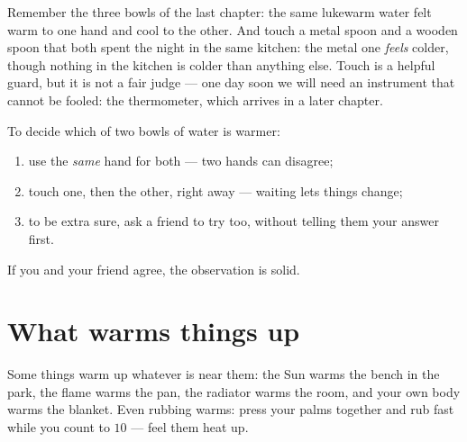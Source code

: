 \begin{remark}\label{rem:g1:hot-and-cold:fooled}
Remember the three bowls of the last chapter: the same lukewarm water
felt warm to one hand and cool to the other. And touch a metal spoon
and a wooden spoon that both spent the night in the same kitchen: the
metal one \emph{feels} colder, though nothing in the kitchen is
colder than anything else. Touch is a helpful guard, but it is not a
fair judge --- one day soon we will need an instrument that cannot be
fooled: the thermometer, which arrives in a later chapter.
\end{remark}

\begin{method}\label{met:g1:hot-and-cold:compare}
To decide which of two bowls of water is warmer:
\begin{enumerate}
  \item use the \emph{same} hand for both --- two hands can disagree;
  \item touch one, then the other, right away --- waiting lets things
        change;
  \item to be extra sure, ask a friend to try too, without telling
        them your answer first.
\end{enumerate}
If you and your friend agree, the observation is solid.
\end{method}

\section{What warms things up}

\begin{example}[Warmers]\label{ex:g1:hot-and-cold:warmers}
Some things warm up whatever is near them: the Sun warms the bench in
the park, the flame warms the pan, the radiator warms the room, and
your own body warms the blanket. Even rubbing warms: press your palms
together and rub fast while you count to $10$ --- feel them heat up.
\end{example}

